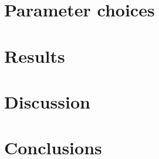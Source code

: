 \documentclass[a4paper,12pt]{scrartcl}
\begin{document}
\inputminted{rust}{supplement/dispersal_model_rust/src/main.rs}

\section{Parameter choices}
\label{s:parameters}
\section{Results}
\label{s:results}
\section{Discussion}
\label{s:discussion}
\section{Conclusions}
\label{s:conclusions}

\printbibliography
\end{document}
